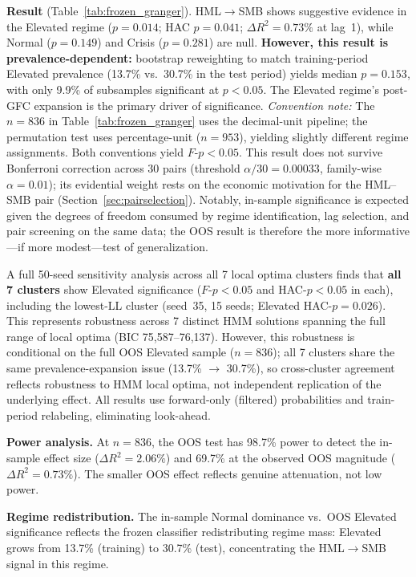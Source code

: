 \documentclass[sigconf,anonymous]{acmart}
\begin{document}
\textbf{Result} (Table~\ref{tab:frozen_granger}). HML$\to$SMB shows suggestive evidence in the Elevated regime
($p = 0.014$; HAC $p = 0.041$; $\Delta R^2 = 0.73\%$ at lag~1),
while Normal ($p = 0.149$) and Crisis ($p = 0.281$) are null.
\textbf{However, this result is prevalence-dependent:} bootstrap reweighting to match
training-period Elevated prevalence (13.7\% vs.\ 30.7\% in the test period)
yields median $p = 0.153$, with only 9.9\% of subsamples significant at $p < 0.05$.
The Elevated regime's post-GFC expansion is the primary driver of significance.
\emph{Convention note:} The $n = 836$ in Table~\ref{tab:frozen_granger} uses the
decimal-unit pipeline; the permutation test uses percentage-unit ($n = 953$), yielding
slightly different regime assignments. Both conventions yield $F$-$p < 0.05$.
This result does not survive Bonferroni correction across 30 pairs
(threshold $\alpha/30 = 0.00033$, family-wise $\alpha = 0.01$); its evidential weight
rests on the economic motivation for the HML--SMB pair
(Section~\ref{sec:pairselection}).
Notably, in-sample significance is expected given the degrees of freedom consumed
by regime identification, lag selection, and pair screening on the same data;
the OOS result is therefore the more informative---if more modest---test of
generalization.

A full 50-seed sensitivity analysis across all 7 local optima clusters finds that
\textbf{all 7 clusters} show Elevated significance ($F$-$p < 0.05$ and HAC-$p < 0.05$
in each), including the lowest-LL cluster (seed~35, 15 seeds; Elevated HAC-$p = 0.026$).
This represents robustness across 7 distinct HMM solutions spanning the full
range of local optima (BIC 75{,}587--76{,}137).
However, this robustness is conditional on the full OOS Elevated sample
($n = 836$); all 7 clusters share the same prevalence-expansion issue
(13.7\% $\to$ 30.7\%), so cross-cluster agreement reflects robustness to
HMM local optima, not independent replication of the underlying effect.
All results use forward-only (filtered) probabilities and train-period relabeling,
eliminating look-ahead.

\textbf{Power analysis.} At $n = 836$, the OOS test has 98.7\% power to detect
the in-sample effect size ($\Delta R^2 = 2.06\%$) and 69.7\% at the observed
OOS magnitude ($\Delta R^2 = 0.73\%$). The smaller OOS effect reflects genuine
attenuation, not low power.

\textbf{Regime redistribution.} The in-sample Normal dominance vs.\ OOS Elevated
significance reflects the frozen classifier redistributing regime mass:
Elevated grows from 13.7\% (training) to 30.7\% (test), concentrating the
HML$\to$SMB signal in this regime.
\end{document}
